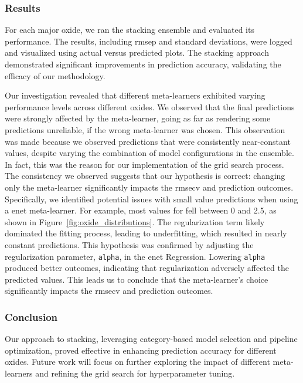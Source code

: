 \subsubsection{Results}\label{subsec:stacking_ensemble_results}

For each major oxide, we ran the stacking ensemble and evaluated its performance.
The results, including \gls{rmsep} and standard deviations, were logged and visualized using actual versus predicted plots.
The stacking approach demonstrated significant improvements in prediction accuracy, validating the efficacy of our methodology.

Our investigation revealed that different meta-learners exhibited varying performance levels across different oxides.
We observed that the final predictions were strongly affected by the meta-learner, going as far as rendering some predictions unreliable, if the wrong meta-learner was chosen.
This observation was made because we observed  predictions that were consistently near-constant values, despite varying the combination of model configurations in the  ensemble.
In fact, this was the reason for our implementation of the grid search process.
The consistency we observed suggests that our hypothesis is correct: changing only the meta-learner significantly impacts the \gls{rmsecv} and prediction outcomes.
Specifically, we identified potential issues with small value predictions when using a \gls{enet} meta-learner.
For example, most values for  fell between 0 and 2.5, as shown in Figure~\ref{fig:oxide_distributions}.
The regularization term likely dominated the fitting process, leading to underfitting, which resulted in nearly constant predictions.
This hypothesis was confirmed by adjusting the regularization parameter, \texttt{alpha}, in the \gls{enet} Regression.
Lowering \texttt{alpha} produced better outcomes, indicating that regularization adversely affected the predicted values.
This leads us to conclude that the meta-learner's choice significantly impacts the \gls{rmsecv} and prediction outcomes.


\subsubsection{Conclusion}

Our approach to stacking, leveraging category-based model selection and pipeline optimization, proved effective in enhancing prediction accuracy for different oxides.
Future work will focus on further exploring the impact of different meta-learners and refining the grid search for hyperparameter tuning.